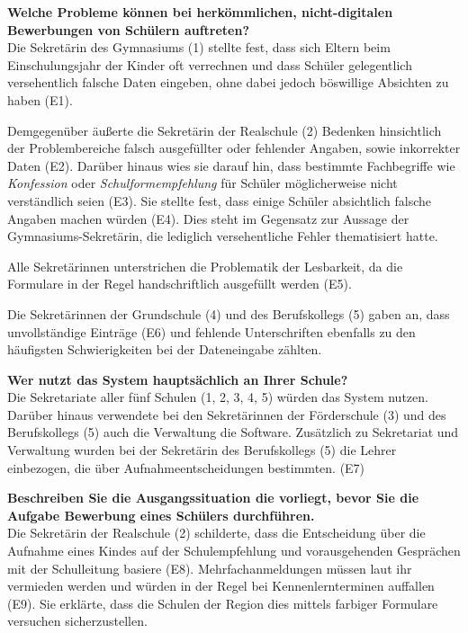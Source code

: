 \textbf{Welche Probleme können bei herkömmlichen, nicht-digitalen Bewerbungen von Schülern auftreten?}\\
Die Sekretärin des Gymnasiums (1) stellte fest, dass sich Eltern beim Einschulungsjahr der Kinder oft verrechnen und dass Schüler gelegentlich versehentlich falsche Daten eingeben, ohne dabei jedoch \glqq böswillige\grqq{} Absichten zu haben (E1). 

Demgegenüber äußerte die Sekretärin der Realschule (2) Bedenken hinsichtlich der Problembereiche falsch ausgefüllter oder fehlender Angaben, sowie inkorrekter Daten (E2). Darüber hinaus wies sie darauf hin, dass bestimmte Fachbegriffe wie \textit{Konfession} oder \textit{Schulformempfehlung} für Schüler möglicherweise nicht verständlich seien (E3). Sie stellte fest, dass einige Schüler absichtlich falsche Angaben machen würden (E4). Dies steht im Gegensatz zur Aussage der Gymnasiums-Sekretärin, die lediglich versehentliche Fehler thematisiert hatte. 

Alle Sekretärinnen unterstrichen die Problematik der Lesbarkeit, da die Formulare in der Regel handschriftlich ausgefüllt werden (E5).

Die Sekretärinnen der Grundschule (4) und des Berufskollegs (5) gaben an, dass unvollständige Einträge (E6) und fehlende Unterschriften ebenfalls zu den häufigsten Schwierigkeiten bei der Dateneingabe zählten.


\textbf{Wer nutzt das System hauptsächlich an Ihrer Schule?}\\
Die Sekretariate aller fünf Schulen (1, 2, 3, 4, 5) würden das System nutzen. Darüber hinaus verwendete bei den Sekretärinnen der Förderschule (3) und des Berufskollegs (5) auch die Verwaltung die Software. Zusätzlich zu Sekretariat und Verwaltung wurden bei der Sekretärin des Berufskollegs (5) die Lehrer einbezogen, die über Aufnahmeentscheidungen bestimmten. (E7)


\textbf{Beschreiben Sie die Ausgangssituation die vorliegt, bevor Sie die Aufgabe \glqq Bewerbung eines Schülers\grqq{} durchführen.}\\
Die Sekretärin der Realschule (2) schilderte, dass die Entscheidung über die Aufnahme eines Kindes auf der Schulempfehlung und vorausgehenden Gesprächen mit der Schulleitung basiere (E8). Mehrfachanmeldungen müssen laut ihr vermieden werden und würden in der Regel bei Kennenlernterminen auffallen (E9). Sie erklärte, dass die Schulen der Region dies mittels farbiger Formulare versuchen sicherzustellen.

